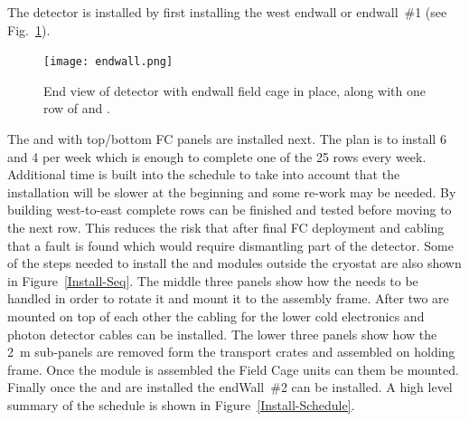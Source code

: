 The  detector is installed by first installing the west endwall or
endwall~\#1 (see Fig.~\ref{fig:endwall}).
\begin{figure}[htbp]
\begin{center}
\texttt{[image: endwall.png]}
\caption{End view of  detector with endwall field cage in
  place, along with one row of  and .}
\label{fig:endwall}
\end{center}
\end{figure}
The  and  with top/bottom FC panels are
installed next. The plan is to install \num{6}  and \num{4}
 per week which is enough to complete one of the \num{25}
rows every week. Additional time is built into the schedule to take
into account that the installation will be slower at the beginning and
some re-work may be needed. By building west-to-east complete rows can
be finished and tested before moving to the next row. This reduces the
risk that after final FC deployment and cabling that a fault is found
which would require dismantling part of the detector. Some of the steps
needed to install the  and  modules outside the
cryostat are also shown in Figure~\ref{Install-Seq}.  The middle three
panels show how the  needs to be handled in order to rotate
it and mount it to the assembly frame. After two  are
mounted on top of each other the cabling for the lower 
cold electronics and photon detector cables can be installed. The
lower three panels show how the \SI{2}{m}  sub-panels are
removed form the transport crates and assembled on holding frame. Once
the  module is assembled the Field Cage units can them be
mounted. Finally once the  and  are installed
the endWall~\#2 can be installed. A high level summary of the schedule
is shown in Figure~\ref{Install-Schedule}.
